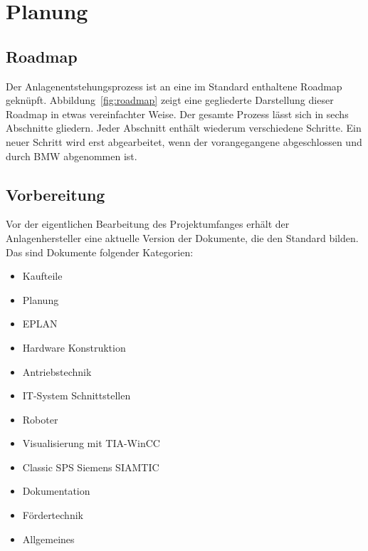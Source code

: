

\chapter{Planung}
\label{chap:planning}

\section{Roadmap}
Der Anlagenentstehungsprozess ist an eine im Standard enthaltene Roadmap geknüpft. Abbildung~\ref{fig:roadmap} zeigt eine gegliederte Darstellung dieser Roadmap in etwas vereinfachter Weise. %
Der gesamte Prozess lässt sich in sechs Abschnitte gliedern. Jeder Abschnitt enthält wiederum verschiedene Schritte. Ein neuer Schritt wird erst abgearbeitet, wenn der vorangegangene abgeschlossen und durch BMW abgenommen ist.

\section{Vorbereitung}
Vor der eigentlichen Bearbeitung des Projektumfanges erhält der Anlagenhersteller eine aktuelle Version der Dokumente, die den Standard bilden. Das sind Dokumente folgender Kategorien:
  \begin{itemize}
    \itemsep0.1em
    \item Kaufteile
    \item Planung
    \item EPLAN
    \item Hardware Konstruktion
    \item Antriebstechnik
    \item IT-System Schnittstellen
    \item Roboter
    \item Visualisierung mit TIA-WinCC
    \item Classic SPS Siemens SIAMTIC
    \item Dokumentation
    \item Fördertechnik
    \item Allgemeines
  \end{itemize}

